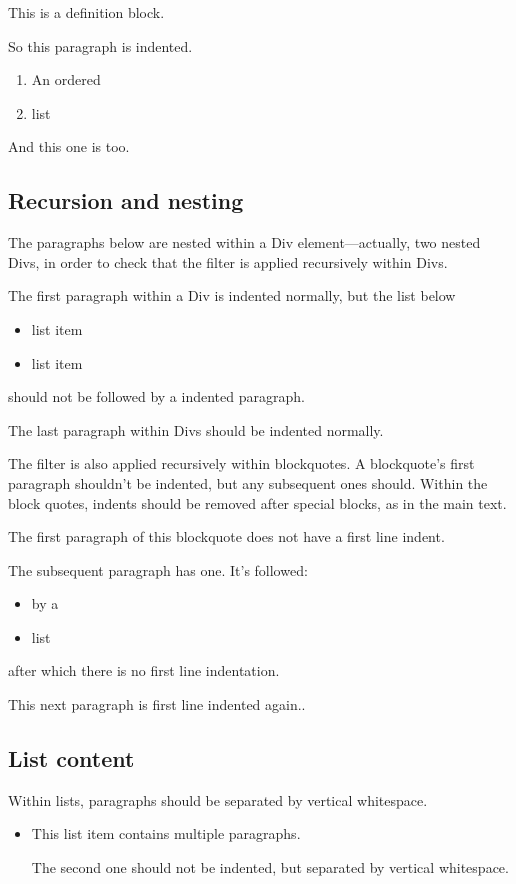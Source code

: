 \documentclass[
  letterpaper,
  DIV=11,
  numbers=noendperiod]{scrartcl}
\makeatletter
\providecommand{\tightlist}{%
  \setlength{\itemsep}{0pt}\setlength{\parskip}{0pt}}
\renewenvironment{quote}
     {\list{}{\listparindent 1.5em%
              \itemindent \listparindent
              \rightmargin \leftmargin
              \parsep \z@ \@plus \p@}%
            \item\noindent\relax}
      {\endlist}
\makeatother
\begin{document}
\begin{description}
\tightlist
\item[Definition]
This is a definition block.
\end{description}

So this paragraph is indented.

\begin{enumerate}
\def\labelenumi{\arabic{enumi}.}
\tightlist
\item
  An ordered
\item
  list
\end{enumerate}

And this one is too.

\subsection{Recursion and nesting}\label{recursion-and-nesting}

The paragraphs below are nested within a Div element---actually, two
nested Divs, in order to check that the filter is applied recursively
within Divs.

\protect{}\label{div}
\protect{}\label{subdiv}
The first paragraph within a Div is indented normally, but the list
below

\begin{itemize}
\tightlist
\item
  list item
\item
  list item
\end{itemize}

\noindent should not be followed by a indented paragraph.

The last paragraph within Divs should be indented normally.

The filter is also applied recursively within blockquotes. A
blockquote's first paragraph shouldn't be indented, but any subsequent
ones should. Within the block quotes, indents should be removed after
special blocks, as in the main text.

\begin{quote}
\noindent The first paragraph of this blockquote does not have a first
line indent.

The subsequent paragraph has one. It's followed:

\begin{itemize}
\tightlist
\item
  by a
\item
  list
\end{itemize}

\noindent after which there is no first line indentation.

This next paragraph is first line indented again..
\end{quote}

\subsection{List content}\label{list-content}

Within lists, paragraphs should be separated by vertical whitespace.

\begin{itemize}
\item
  This list item contains multiple paragraphs.

  The second one should not be indented, but separated by vertical
  whitespace.
\end{itemize}
\end{document}
